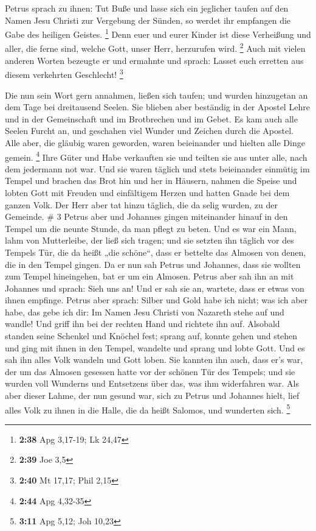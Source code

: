  Petrus sprach zu ihnen: Tut Buße und lasse sich ein
jeglicher taufen auf den Namen Jesu Christi zur Vergebung der Sünden, so
werdet ihr empfangen die Gabe des heiligen Geistes. \footnote{\textbf{2:38}
  Apg 3,17-19; Lk 24,47}  Denn euer und eurer Kinder ist
diese Verheißung und aller, die ferne sind, welche Gott, unser Herr,
herzurufen wird. \footnote{\textbf{2:39} Joe 3,5}  Auch
mit vielen anderen Worten bezeugte er und ermahnte und sprach: Lasset
euch erretten aus diesem verkehrten Geschlecht! \footnote{\textbf{2:40}
  Mt 17,17; Phil 2,15}

 Die nun sein Wort gern annahmen, ließen sich taufen; und
wurden hinzugetan an dem Tage bei dreitausend Seelen. 
Sie blieben aber beständig in der Apostel Lehre und in der Gemeinschaft
und im Brotbrechen und im Gebet.  Es kam auch alle Seelen
Furcht an, und geschahen viel Wunder und Zeichen durch die Apostel.
 Alle aber, die gläubig waren geworden, waren beieinander
und hielten alle Dinge gemein. \footnote{\textbf{2:44} Apg 4,32-35}
 Ihre Güter und Habe verkauften sie und teilten sie aus
unter alle, nach dem jedermann not war.  Und sie waren
täglich und stets beieinander einmütig im Tempel und brachen das Brot
hin und her in Häusern,  nahmen die Speise und lobten
Gott mit Freuden und einfältigem Herzen und hatten Gnade bei dem ganzen
Volk. Der Herr aber tat hinzu täglich, die da selig wurden, zu der
Gemeinde. \# 3  Petrus aber und Johannes gingen
miteinander hinauf in den Tempel um die neunte Stunde, da man pflegt zu
beten.  Und es war ein Mann, lahm von Mutterleibe, der
ließ sich tragen; und sie setzten ihn täglich vor des Tempels Tür, die
da heißt „die schöne``, dass er bettelte das Almosen von denen, die in
den Tempel gingen.  Da er nun sah Petrus und Johannes,
dass sie wollten zum Tempel hineingehen, bat er um ein Almosen.
 Petrus aber sah ihn an mit Johannes und sprach: Sieh uns
an!  Und er sah sie an, wartete, dass er etwas von ihnen
empfinge.  Petrus aber sprach: Silber und Gold habe ich
nicht; was ich aber habe, das gebe ich dir: Im Namen Jesu Christi von
Nazareth stehe auf und wandle!  Und griff ihn bei der
rechten Hand und richtete ihn auf. Alsobald standen seine Schenkel und
Knöchel fest;  sprang auf, konnte gehen und stehen und
ging mit ihnen in den Tempel, wandelte und sprang und lobte Gott.
 Und es sah ihn alles Volk wandeln und Gott loben.
 Sie kannten ihn auch, dass er's war, der um das Almosen
gesessen hatte vor der schönen Tür des Tempels; und sie wurden voll
Wunderns und Entsetzens über das, was ihm widerfahren war.
 Als aber dieser Lahme, der nun gesund war, sich zu
Petrus und Johannes hielt, lief alles Volk zu ihnen in die Halle, die da
heißt Salomos, und wunderten sich. \footnote{\textbf{3:11} Apg 5,12; Joh
  10,23}

